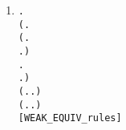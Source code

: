 \begin{enumerate}
\item \begin{alltt}
\HOLTokenTurnstile{} \HOLSymConst{\HOLTokenForall{}} .
       (\HOLSymConst{\HOLTokenForall{}}.
            (\HOLSymConst{\HOLTokenForall{}}.
                  \HOLTokenTransBegin{} \HOLTokenTransEnd {} \HOLSymConst{\HOLTokenImp{}}
                 \HOLSymConst{\HOLTokenExists{}}.  \HOLTokenWeakTransBegin{} \HOLTokenWeakTransEnd {} \HOLSymConst{\HOLTokenConj{}}  \HOLSymConst{\HOLTokenWeakEQ} ) \HOLSymConst{\HOLTokenConj{}}
            \HOLSymConst{\HOLTokenForall{}}.
                 \HOLTokenTransBegin{} \HOLTokenTransEnd {} \HOLSymConst{\HOLTokenImp{}} \HOLSymConst{\HOLTokenExists{}}.  \HOLTokenWeakTransBegin{} \HOLTokenWeakTransEnd {} \HOLSymConst{\HOLTokenConj{}}  \HOLSymConst{\HOLTokenWeakEQ} ) \HOLSymConst{\HOLTokenConj{}}
       (\HOLSymConst{\HOLTokenForall{}}.  \HOLTokenTransBegin\HOLSymConst{\ensuremath{\tau}}\HOLTokenTransEnd {} \HOLSymConst{\HOLTokenImp{}} \HOLSymConst{\HOLTokenExists{}}.  \HOLSymConst{\HOLTokenEPS}  \HOLSymConst{\HOLTokenConj{}}  \HOLSymConst{\HOLTokenWeakEQ} ) \HOLSymConst{\HOLTokenConj{}}
       (\HOLSymConst{\HOLTokenForall{}}.  \HOLTokenTransBegin\HOLSymConst{\ensuremath{\tau}}\HOLTokenTransEnd {} \HOLSymConst{\HOLTokenImp{}} \HOLSymConst{\HOLTokenExists{}}.  \HOLSymConst{\HOLTokenEPS}  \HOLSymConst{\HOLTokenConj{}}  \HOLSymConst{\HOLTokenWeakEQ} ) \HOLSymConst{\HOLTokenImp{}}
        \HOLSymConst{\HOLTokenWeakEQ} \hfill{[WEAK_EQUIV_rules]}

\end{alltt}
\end{enumerate}
